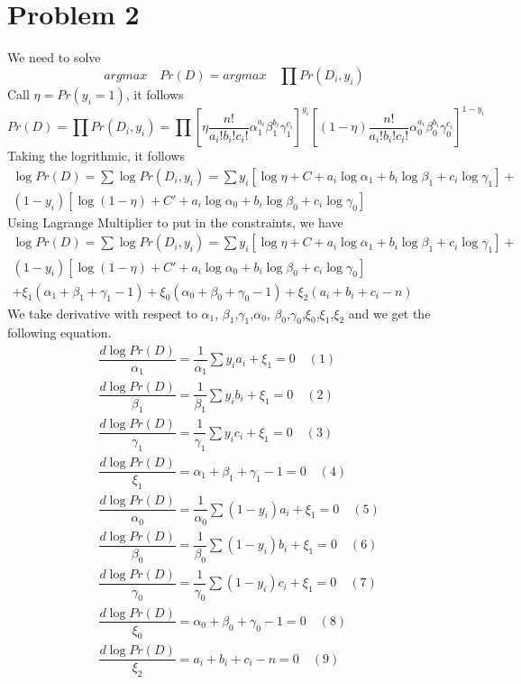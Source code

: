 \section{Problem 2}
We need to solve \[argmax \quad Pr(D)=argmax\quad\prod Pr(D_i,y_i)\] Call $\eta=Pr(y_i=1)$, it follows 
\[Pr(D)=\prod Pr(D_i,y_i)=\prod [\eta\dfrac{n!}{a_i!b_i!c_i!}\alpha_1^{a_i}\beta_1^{b_i}\gamma_1^{c_i}]^{y_i}[(1-\eta)\dfrac{n!}{a_i!b_i!c_i!}\alpha_0^{a_i}\beta_0^{b_i}\gamma_0^{c_i}]^{1-y_i}\]
Taking the logrithmic, it follows 
\begin{multline*}
\log{Pr(D)} =\sum \log{Pr(D_i,y_i)} =\sum y_i[\log{\eta}+C+a_i\log{\alpha_1}+b_i\log{\beta_1}+c_i\log{\gamma_1}]+\\(1-y_i)[\log{(1-\eta)}+C'+a_i\log{\alpha_0}+b_i\log{\beta_0}+c_i\log{\gamma_0}]
\end{multline*}
Using Lagrange Multiplier to put in the constraints, we have 
\begin{multline*}
\log{Pr(D)} =\sum \log{Pr(D_i,y_i)} =\sum y_i[\log{\eta}+C+a_i\log{\alpha_1}+b_i\log{\beta_1}+c_i\log{\gamma_1}]+
\\(1-y_i)[\log{(1-\eta)}+C'+a_i\log{\alpha_0}+b_i\log{\beta_0}+c_i\log{\gamma_0}]
\\+\xi_1(\alpha_1+\beta_1+\gamma_1-1)+\xi_0(\alpha_0+\beta_0+\gamma_0-1)+\xi_2(a_i+b_i+c_i-n)
\end{multline*}
We take derivative with respect to $\alpha_1$, $\beta_1$,$\gamma_1$,$\alpha_0$, $\beta_0$,$\gamma_0$,$\xi_0$,$\xi_1$,$\xi_2$ and we get the following equation.
\begin{align*}
&\dfrac{d\log{Pr(D)}}{\alpha_1}=\dfrac{1}{\alpha_1}\sum y_ia_i+\xi_1=0\quad(1)\\
&\dfrac{d\log{Pr(D)}}{\beta_1}=\dfrac{1}{\beta_1}\sum y_ib_i+\xi_1=0\quad(2)\\
&\dfrac{d\log{Pr(D)}}{\gamma_1}=\dfrac{1}{\gamma_1}\sum y_ic_i+\xi_1=0\quad(3)\\
&\dfrac{d\log{Pr(D)}}{\xi_1}=\alpha_1+\beta_1+\gamma_1-1=0\quad(4)\\
&\dfrac{d\log{Pr(D)}}{\alpha_0}=\dfrac{1}{\alpha_0}\sum (1-y_i)a_i+\xi_1=0\quad(5)\\
&\dfrac{d\log{Pr(D)}}{\beta_0}=\dfrac{1}{\beta_0}\sum (1-y_i)b_i+\xi_1=0\quad(6)\\
&\dfrac{d\log{Pr(D)}}{\gamma_0}=\dfrac{1}{\gamma_0}\sum (1-y_i)c_i+\xi_1=0\quad(7)\\
&\dfrac{d\log{Pr(D)}}{\xi_0}=\alpha_0+\beta_0+\gamma_0-1=0\quad (8)\\
&\dfrac{d\log{Pr(D)}}{\xi_2}=a_i+b_i+c_i-n=0\quad (9)\\
\end{align*}
